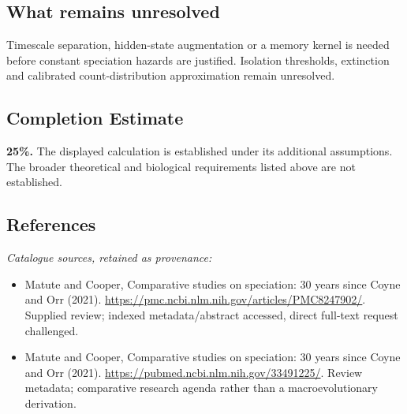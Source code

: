 \documentclass[11pt]{article}
\begin{document}
\subsection{What remains unresolved}
Timescale separation, hidden-state augmentation or a memory kernel is needed before constant speciation hazards are justified. Isolation thresholds, extinction and calibrated count-distribution approximation remain unresolved.
\subsection{Completion Estimate}
\textbf{25\%.} The displayed calculation is established under its additional assumptions. The broader theoretical and biological requirements listed above are not established.
\subsection{References}
\noindent\emph{Catalogue sources, retained as provenance:}
\begin{itemize}
\item Matute and Cooper, Comparative studies on speciation: 30 years since Coyne and Orr (2021). \url{https://pmc.ncbi.nlm.nih.gov/articles/PMC8247902/}. Supplied review; indexed metadata/abstract accessed, direct full-text request challenged.
\item Matute and Cooper, Comparative studies on speciation: 30 years since Coyne and Orr (2021). \url{https://pubmed.ncbi.nlm.nih.gov/33491225/}. Review metadata; comparative research agenda rather than a macroevolutionary derivation.
\end{itemize}
\clearpage


\appendix
\end{document}
